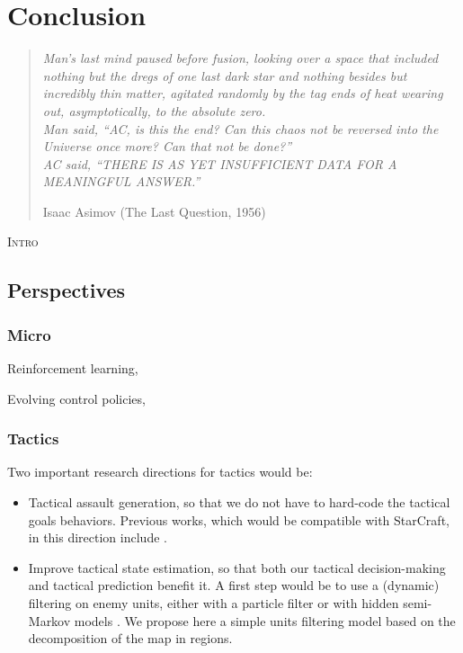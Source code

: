 \chapter{Conclusion}
\begin{quotation}\textit{
Man's last mind paused before fusion, looking over a space that included nothing but the dregs of one last dark star and nothing besides but incredibly thin matter, agitated randomly by the tag ends of heat wearing out, asymptotically, to the absolute zero.\\
Man said, ``AC, is this the end? Can this chaos not be reversed into the Universe once more? Can that not be done?''\\
AC said, ``THERE IS AS YET INSUFFICIENT DATA FOR A MEANINGFUL ANSWER.''
}
\begin{flushright}Isaac Asimov (The Last Question, 1956)\end{flushright}\end{quotation}

\lettrine{I}{ntro}
\chaptertoc

\section{Perspectives}
\label{chapter:perspectives}
\subsection{Micro}

Reinforcement learning, \citep{Marthi05concurrenthierarchical}


Evolving control policies, \citep{Miles2007}
\subsection{Tactics}

Two important research directions for tactics would be:
\begin{itemize}
    \item Tactical assault generation, so that we do not have to hard-code the tactical goals behaviors. Previous works, which would be compatible with StarCraft, in this direction include \citep{Chung05,PonsenMSA06,UCT}.
    \item Improve tactical state estimation, so that both our tactical decision-making and tactical prediction benefit it. A first step would be to use a (dynamic) filtering on enemy units, either with a particle filter \citep{Thrun02d,weber2011aiide} or with hidden semi-Markov models \citep{Hladky_anevaluation}. We propose here a simple units filtering model based on the decomposition of the map in regions.
\end{itemize}

